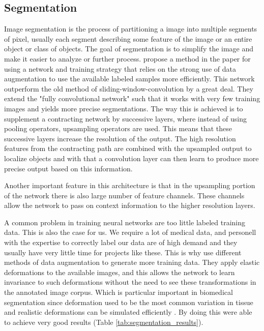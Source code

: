 \documentclass[thesis.tex]{subfiles}
\begin{document}
\subsection{Segmentation} \label{sec:segmentation}
Image segmentation is the process of partitioning a image into multiple segments of pixel, usually each segment describing some feature of the image or an entire object or class of objects. The goal of segmentation is to simplify the image and make it easier to analyze or further process. \citeauthor*{UNetConvolutional15} propose a method in the paper  \cite{UNetConvolutional15} for using a network and training strategy that relies on the strong use of data augmentation to use the available labeled samples more efficiently. This network outperform the old method of sliding-window-convolution by a great deal. They extend the "fully convolutional network" \cite{FullyConvolutional15} such that it works with very few training images and yields more precise segmentations. The way this is achieved is to supplement a contracting network by successive layers, where instead of using pooling operators, upsampling operators are used. This means that these successive layers increase the resolution of the output. The high resolution features from the contracting path are combined with the upsampled output to localize objects and with that a convolution layer can then learn to produce more precise output based on this information. 

Another important feature in this architecture is that in the upsampling portion of the network there is also large number of feature channels. These channels allow the network to pass on context information to the higher resolution layers. 

A common problem in training neural networks are too little labeled training data. This is also the case for us. We require a lot of medical data, and personell with the expertise to correctly label our data are of high demand and they usually have very little time for projects like these. This is why \citeauthor*{UNetConvolutional15} use different methods of data augmentation to generate more training data. They apply elastic deformations to the available images, and this allows the network to learn invariance to such deformations without the need to see these transformations in the annotated image corpus. Which is particular important in biomedical segmentation since deformation used to be the most common variation in tissue and realistic deformations can be simulated efficiently \cite{UNetConvolutional15}. By doing this \citeauthor*{UNetConvolutional15} were able to achieve very good results (Table \ref{tab:segmentation_results}).
\end{document}
